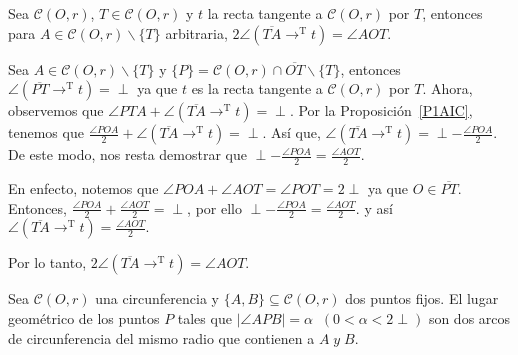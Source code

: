 \begin{prop}
Sea $\mathcal{C}(O,r)$, $T\in\mathcal{C}(O,r)$ y $t$ la recta tangente a $\mathcal{C}(O,r)$ por $T$, entonces para $A\in\mathcal{C}(O,r)\backslash\{T\}$ arbitraria, $2 \angle (\overline{TA}\longrightarrow^\text{T}t)=\angle AOT$.
\end{prop}
\begin{pba} 
Sea $A\in\mathcal{C}(O,r)\backslash\{T\}$ y $\{P\}=\mathcal{C}(O,r)\cap\overline{OT}\backslash\{T\}$, entonces $\angle (\overline{PT}\longrightarrow^\text{T}t)=\perp$ ya que $t$ es la recta tangente a $\mathcal{C}(O,r)$ por $T$.
Ahora, observemos que $\angle PTA+\angle (\overline{TA}\longrightarrow^\text{T}t)=\perp$. Por la Proposición~\ref{P1AIC}, tenemos que $\frac{\angle POA}{2}+\angle (\overline{TA}\longrightarrow^\text{T}t)=\perp$. Así que, $\angle (\overline{TA}\longrightarrow^\text{T}t)=\perp-\frac{\angle POA}{2}.$
De este modo, nos resta demostrar que $\perp-\frac{\angle POA}{2}=\frac{\angle AOT}{2}.$

En enfecto, notemos que $\angle POA+\angle AOT=\angle POT=2\perp$ ya que $O\in\overline{PT}$. Entonces, $\frac{\angle POA}{2}+\frac{\angle AOT}{2}=\perp$, por ello $\perp-\frac{\angle POA}{2}=\frac{\angle AOT}{2}.$ y así $\angle (\overline{TA}\longrightarrow^\text{T}t)=\frac{\angle AOT}{2}.$

Por lo tanto, $2 \angle (\overline{TA}\longrightarrow^\text{T}t)=\angle AOT$.
\end{pba}

\begin{prop}\label{PLGA}
Sea $\mathcal{C}(O,r)$ una circunferencia y $\{A,B\}\subseteq\mathcal{C}(O,r)$ dos puntos fijos. El lugar geométrico de los puntos $P$ tales que $|\angle APB|=\alpha\;\;(0<\alpha<2\perp)$  son dos arcos de circunferencia del mismo radio que contienen a $A\;y\;B.$
\end{prop}
\begin{pba}

\end{pba}

